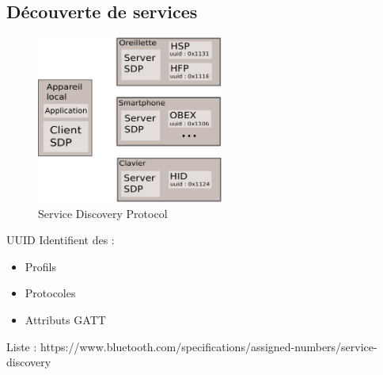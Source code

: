 \subsection{Découverte de services}
\begin{frame}
\begin{minipage}[t]{0.70\linewidth}

\begin{figure}
\includegraphics[height=5.5cm]{img/sdp.png}
\caption{Service Discovery Protocol}
\end{figure}


\end{minipage}
\begin{minipage}[t]{0.27\linewidth}
\begin{block}{UUID}
Identifient des :
\begin{itemize}
\item Profils
\item Protocoles
\item Attributs GATT
\end{itemize}
\end{block}

\end{minipage}
{\tiny Liste : https://www.bluetooth.com/specifications/assigned-numbers/service-discovery}
\end{frame}
